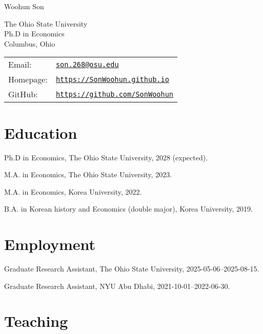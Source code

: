\documentclass[letterpaper]{article}
\def\name{Woohun Son}
\renewenvironment{itemize}{
  \begin{list}{}{
    \setlength{\leftmargin}{1.5em}
  }
}{
  \end{list}
}
\begin{document}
{\huge \name}

\vspace{0.25in}

\begin{minipage}{0.45\linewidth}
  The Ohio State University \\
  Ph.D in Economics \\
  Columbus, Ohio
\end{minipage}
\begin{minipage}{0.45\linewidth}
  \begin{tabular}{ll}
    Email: & \href{mailto:son.268@osu.edu}{\tt son.268@osu.edu} \\
    Homepage: & \href{https://SonWoohun.github.io}{\tt https://SonWoohun.github.io} \\
    GitHub: & \href{https://github.com/SonWoohun}{\tt https://github.com/SonWoohun} \\
  \end{tabular}
\end{minipage}


\section*{Education}

\begin{itemize}
  \item Ph.D in Economics, The Ohio State University, 2028 (expected).
  \item M.A. in Economics, The Ohio State University, 2023.
  \item M.A. in Economics, Korea University, 2022.
  \item B.A. in Korean history and Economics (double major), Korea University, 2019.
\end{itemize}


\section*{Employment}

\begin{itemize}
\item Graduate Research Assistant, The Ohio State University, 2025-05-06--2025-08-15.
\item Graduate Research Assistant, NYU Abu Dhabi, 2021-10-01--2022-06-30.
\end{itemize}


\section*{Teaching}
\end{document}
